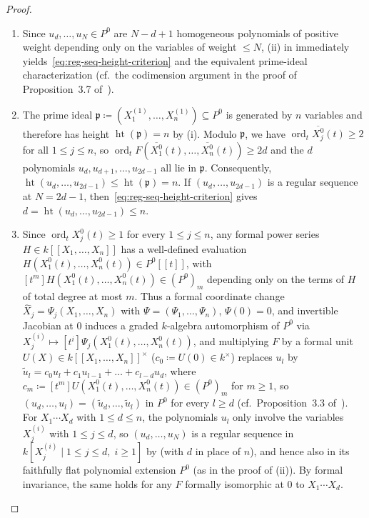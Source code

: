 \documentclass[a4paper, 12pt, reqno]{amsart}
\theoremstyle{remark}
\begin{document}
\begin{proof}
  \begin{enumerate}
  \item Since $u_d, \dots, u_N \in P^0$ are $N - d + 1$ homogeneous polynomials of positive weight depending only on the variables of weight $\le N$,
    (ii) in  immediately yields~\eqref{eq:reg-seq-height-criterion} and the equivalent prime-ideal characterization
    (cf.\ the codimension argument in the proof of Proposition~3.7 of~\cite{bruschek_arc_2013}).

  \item The prime ideal $\mathfrak{p} \coloneq (X_1^{(1)}, \dots, X_n^{(1)}) \subseteq P^0$ is generated by $n$ variables and therefore has height $\operatorname{ht}(\mathfrak{p}) = n$ by (i).
    Modulo $\mathfrak{p}$,
    we have $\operatorname{ord}_t \overline{X^0_j}(t) \ge 2$ for all $1 \le j \le n$,
    so $\operatorname{ord}_t F(\overline{X^0_1}(t), \dots, \overline{X^0_n}(t)) \ge 2 d$ and the $d$ polynomials $u_d, u_{d + 1}, \dots, u_{2d - 1}$ all lie in $\mathfrak{p}$.
    Consequently,
    $\operatorname{ht}(u_d, \dots, u_{2d - 1}) \le \operatorname{ht}(\mathfrak{p}) = n$.
    If $(u_d, \dots, u_{2d - 1})$ is a regular sequence at $N = 2d - 1$,
    then~\eqref{eq:reg-seq-height-criterion} gives $d = \operatorname{ht}(u_d, \dots, u_{2d - 1}) \le n$.

  \item Since $\operatorname{ord}_t X^0_j(t) \ge 1$ for every $1 \le j \le n$,
    any formal power series $H \in k[[X_1, \dots, X_n]]$ has a well-defined evaluation $H(X^0_1(t), \dots, X^0_n(t)) \in P^0[[t]]$,
    with $[t^m]H(X^0_1(t), \dots, X^0_n(t)) \in (P^0)_m$ depending only on the terms of $H$ of total degree at most $m$.
    Thus a formal coordinate change $\hat{X}_j = \Psi_j(X_1, \dots, X_n)$ with $\Psi = (\Psi_1, \dots, \Psi_n)$, $\Psi(0) = 0$, and invertible Jacobian at $0$ induces a graded $k$-algebra automorphism of $P^0$ via $X_j^{(i)} \mapsto [t^i]\Psi_j(X^0_1(t), \dots, X^0_n(t))$,
    and multiplying $F$ by a formal unit $U(X) \in k[[X_1, \dots, X_n]]^\times$ ($c_0 \coloneq U(0) \in k^\times$) replaces $u_l$ by $\tilde{u}_l = c_0 u_l + c_1 u_{l - 1} + \dots + c_{l - d} u_d$,
    where $c_m \coloneq [t^m]U(X^0_1(t), \dots, X^0_n(t)) \in (P^0)_m$ for $m \ge 1$,
    so $(u_d, \dots, u_l) = (\tilde{u}_d, \dots, \tilde{u}_l)$ in $P^0$ for every $l \ge d$
    (cf.\ Proposition~3.3 of~\cite{bruschek_arc_2013}).
    For $X_1 \cdots X_d$ with $1 \le d \le n$,
    the polynomials $u_l$ only involve the variables $X_j^{(i)}$ with $1 \le j \le d$,
    so $(u_d, \dots, u_N)$ is a regular sequence in $k[X_j^{(i)} \mid 1 \le j \le d,\; i \ge 1]$ by  (with $d$ in place of $n$),
    and hence also in its faithfully flat polynomial extension $P^0$ (as in the proof of (ii)).
    By formal invariance,
    the same holds for any $F$ formally isomorphic at $0$ to $X_1 \cdots X_d$.


\end{enumerate}
\end{proof}
\end{document}

